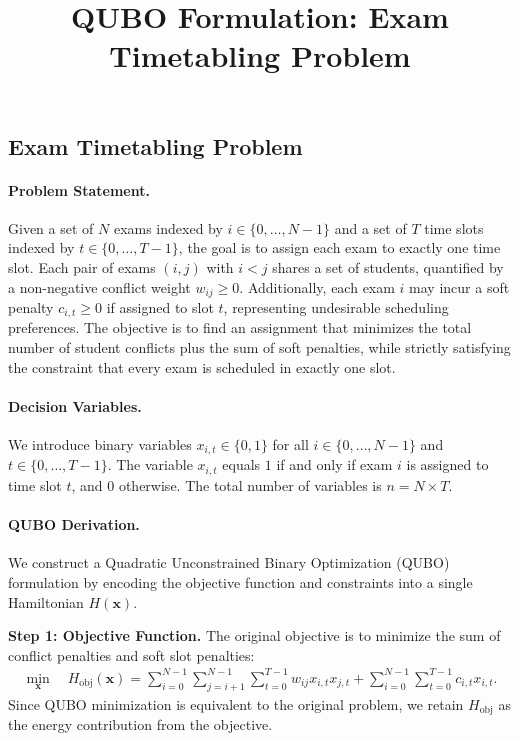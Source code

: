 \documentclass[12pt]{article}
\title{QUBO Formulation: Exam Timetabling Problem}
\date{}
\begin{document}
\maketitle

\subsection*{Exam Timetabling Problem}

\paragraph{Problem Statement.}
Given a set of $N$ exams indexed by $i \in \{0, \dots, N-1\}$ and a set of $T$ time slots indexed by $t \in \{0, \dots, T-1\}$, the goal is to assign each exam to exactly one time slot. Each pair of exams $(i, j)$ with $i < j$ shares a set of students, quantified by a non-negative conflict weight $w_{ij} \ge 0$. Additionally, each exam $i$ may incur a soft penalty $c_{i,t} \ge 0$ if assigned to slot $t$, representing undesirable scheduling preferences. The objective is to find an assignment that minimizes the total number of student conflicts plus the sum of soft penalties, while strictly satisfying the constraint that every exam is scheduled in exactly one slot.

\paragraph{Decision Variables.}
We introduce binary variables $x_{i,t} \in \{0, 1\}$ for all $i \in \{0, \dots, N-1\}$ and $t \in \{0, \dots, T-1\}$. The variable $x_{i,t}$ equals $1$ if and only if exam $i$ is assigned to time slot $t$, and $0$ otherwise. The total number of variables is $n = N \times T$.

\paragraph{QUBO Derivation.}
We construct a Quadratic Unconstrained Binary Optimization (QUBO) formulation by encoding the objective function and constraints into a single Hamiltonian $H(\mathbf{x})$.

\textbf{Step 1: Objective Function.}
The original objective is to minimize the sum of conflict penalties and soft slot penalties:
\begin{align}
    \min_{\mathbf{x}} \quad H_{\text{obj}}(\mathbf{x}) = \sum_{i=0}^{N-1} \sum_{j=i+1}^{N-1} \sum_{t=0}^{T-1} w_{ij} x_{i,t} x_{j,t} + \sum_{i=0}^{N-1} \sum_{t=0}^{T-1} c_{i,t} x_{i,t}.
\end{align}
Since QUBO minimization is equivalent to the original problem, we retain $H_{\text{obj}}$ as the energy contribution from the objective.
\end{document}
